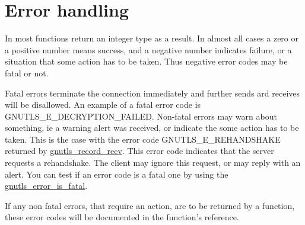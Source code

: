 \section{Error handling}
\par
In \gnutls{} most functions return an integer type as a result.
In almost all cases a zero or a positive number means success, and
a negative number indicates failure, or a situation that some
action has to be taken. Thus negative error codes may be fatal
or not. 
\par 
Fatal errors terminate the connection immediately and
further sends ard receives will be disallowed. An example of
a fatal error code is GNUTLS\_E\_DECRYPTION\_FAILED. Non-fatal errors
may warn about something, ie a warning alert was received, or
indicate the some action has to be taken. This is the case with
the error code GNUTLS\_E\_REHANDSHAKE returned by 
\hyperref{gnutls\_record\_recv()}{gnutls\_record\_recv() (see Section }{)}{gnutls_record_recv}.
This error code indicates that the server requests a rehandshake. The client
may ignore this request, or may reply with an alert.
You can test if an error code is a fatal one by using the
\hyperref{gnutls\_error\_is\_fatal()}{gnutls\_error\_is\_fatal() (see Section }{)}{gnutls_error_is_fatal}.
\par
If any non fatal errors, that require an action, are to be returned by a
function, these error codes will be documented
in the function's reference.

